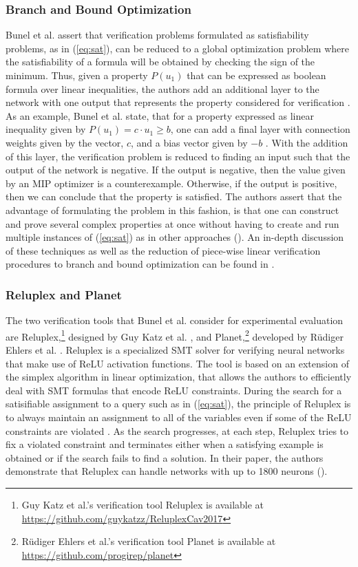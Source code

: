 \documentclass[10pt,conference]{IEEEtran}
\begin{document}
\subsubsection{Branch and Bound Optimization}
 Bunel et al. assert that verification problems formulated as satisfiability problems, as in (\ref{eq:sat}), can be reduced to a global optimization problem where the satisfiability of a formula will be obtained by checking the sign of the minimum. Thus, given a property $P(u_1)$ that can be expressed as boolean formula over linear inequalities, the authors add an additional layer to the network with one output that represents the property considered for verification \cite{BunelPiecewise2017}. As an example, Bunel et al. state, that for a property expressed as linear inequality given by $P(u_1)=c\cdot u_1 \geq b$, one can add a final layer with connection weights given by the vector, $c$, and a bias vector given by $-b$ \cite{BunelPiecewise2017}. With the addition of this layer, the verification problem is reduced to finding an input such that the output of the network is negative. If the output is negative, then the value given by an MIP optimizer is a counterexample. Otherwise, if the output is positive, then we can conclude that the property is satisfied. The authors assert that the advantage of formulating the problem in this fashion, is that one can construct and prove several complex properties at once without having to create and run multiple instances of (\ref{eq:sat}) as in other approaches (\cite{KatzReluplex2017, EhlersFormal2018}). An in-depth discussion of these techniques as well as the reduction of piece-wise linear verification procedures to branch and bound optimization can be found in \cite{BunelPiecewise2017}.
\subsubsection{Reluplex and Planet}
The two verification tools that Bunel et al. consider for experimental evaluation are Reluplex,\footnote{Guy Katz et al.'s verification tool Reluplex is available at \url{https://github.com/guykatzz/ReluplexCav2017}} designed by Guy Katz et al. \cite{KatzReluplex2017}, and Planet,\footnote{R\"{u}diger Ehlers et al.'s verification tool Planet is available at \url{https://github.com/progirep/planet}} developed by R\"{u}diger Ehlers et al. \cite{EhlersFormal2018}. Reluplex is a specialized SMT solver for verifying neural networks that make use of ReLU activation functions. The tool is based on an extension of the simplex algorithm \cite{Nelder1965} in linear optimization, that allows the authors to efficiently deal with SMT formulas that encode ReLU constraints. During the search for a satisifiable assignment to a query such as in (\ref{eq:sat}), the principle of Reluplex is to always maintain an assignment to all of the variables even if some of the ReLU constraints are violated \cite{KatzReluplex2017}. As the search progresses, at each step, Reluplex tries to fix a violated constraint and terminates either when a satisfying example is obtained or if the search fails to find a solution. In their paper, the authors demonstrate that Reluplex can handle networks with up to 1800 neurons (\cite{KatzReluplex2017}\cite{LeofanteAdvances2018}).
\end{document}
